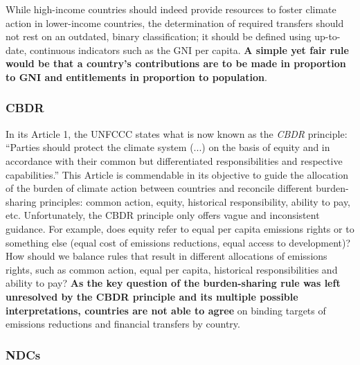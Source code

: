 \documentclass[12pt,english]{article}
\begin{document}
While high-income countries should indeed provide resources to foster climate action in lower-income countries, the determination of required transfers should not rest on an outdated, binary classification; it should be defined using up-to-date, continuous indicators such as the GNI per capita. \textbf{A simple yet fair rule would be that a country's contributions are to be made in proportion to GNI and entitlements in proportion to population}. 

\subsubsection{CBDR\label{subsubsec:cbdr}} 
In its Article 1, the UNFCCC states what is now known as the \textit{CBDR} principle: ``Parties should protect the climate system (...) on the basis of equity and in accordance with their common but differentiated responsibilities and respective capabilities.'' This Article is commendable in its objective to guide the allocation of the burden of climate action between countries and reconcile different burden-sharing principles: common action, equity, historical responsibility, ability to pay, etc. Unfortunately, the CBDR principle only offers vague and inconsistent guidance. For example, does equity refer to equal per capita emissions rights or to something else (equal cost of emissions reductions, equal access to development)? How should we balance rules that result in different allocations of emissions rights, such as common action, equal per capita, historical responsibilities and ability to pay? \textbf{As the key question of the burden-sharing rule was left unresolved by the CBDR principle and its multiple possible interpretations, countries are not able to agree} on binding targets of emissions reductions and financial transfers by country. 

\subsubsection{NDCs\label{subsubsec:ndc}} 
\end{document}
